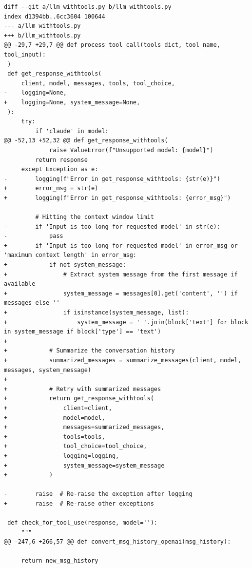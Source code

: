 \documentclass{article}
\begin{document}
\begin{lstlisting}[style=diffstyle]
diff --git a/llm_withtools.py b/llm_withtools.py
index d1394bb..6cc3604 100644
--- a/llm_withtools.py
+++ b/llm_withtools.py
@@ -29,7 +29,7 @@ def process_tool_call(tools_dict, tool_name, tool_input):
 )
 def get_response_withtools(
     client, model, messages, tools, tool_choice,
-    logging=None,
+    logging=None, system_message=None,
 ):
     try:
         if 'claude' in model:
@@ -52,13 +52,32 @@ def get_response_withtools(
             raise ValueError(f"Unsupported model: {model}")
         return response
     except Exception as e:
-        logging(f"Error in get_response_withtools: {str(e)}")
+        error_msg = str(e)
+        logging(f"Error in get_response_withtools: {error_msg}")
 
         # Hitting the context window limit
-        if 'Input is too long for requested model' in str(e):
-            pass
+        if 'Input is too long for requested model' in error_msg or 'maximum context length' in error_msg:
+            if not system_message:
+                # Extract system message from the first message if available
+                system_message = messages[0].get('content', '') if messages else ''
+                if isinstance(system_message, list):
+                    system_message = ' '.join(block['text'] for block in system_message if block['type'] == 'text')
+
+            # Summarize the conversation history
+            summarized_messages = summarize_messages(client, model, messages, system_message)
+            
+            # Retry with summarized messages
+            return get_response_withtools(
+                client=client,
+                model=model,
+                messages=summarized_messages,
+                tools=tools,
+                tool_choice=tool_choice,
+                logging=logging,
+                system_message=system_message
+            )
 
-        raise  # Re-raise the exception after logging
+        raise  # Re-raise other exceptions
 
 def check_for_tool_use(response, model=''):
     """
@@ -247,6 +266,57 @@ def convert_msg_history_openai(msg_history):
 
     return new_msg_history
 

\end{lstlisting}
\end{document}
